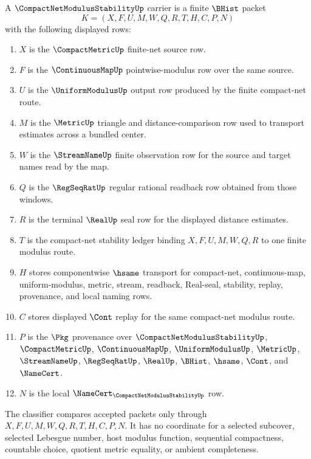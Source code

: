 \begin{definition}
\label{def:compact-net-modulus-stability-carrier}
A $\CompactNetModulusStabilityUp$ carrier is a finite $\BHist$ packet
$$
K=(X,F,U,M,W,Q,R,T,H,C,P,N)
$$
with the following displayed rows:
\begin{enumerate}
\item $X$ is the $\CompactMetricUp$ finite-net source row.
\item $F$ is the $\ContinuousMapUp$ pointwise-modulus row over the same source.
\item $U$ is the $\UniformModulusUp$ output row produced by the finite compact-net route.
\item $M$ is the $\MetricUp$ triangle and distance-comparison row used to transport estimates across a bundled center.
\item $W$ is the $\StreamNameUp$ finite observation row for the source and target names read by the map.
\item $Q$ is the $\RegSeqRatUp$ regular rational readback row obtained from those windows.
\item $R$ is the terminal $\RealUp$ seal row for the displayed distance estimates.
\item $T$ is the compact-net stability ledger binding $X,F,U,M,W,Q,R$ to one finite modulus route.
\item $H$ stores componentwise $\hsame$ transport for compact-net, continuous-map, uniform-modulus, metric, stream, readback, Real-seal, stability, replay, provenance, and local naming rows.
\item $C$ stores displayed $\Cont$ replay for the same compact-net modulus route.
\item $P$ is the $\Pkg$ provenance over $\CompactNetModulusStabilityUp$, $\CompactMetricUp$, $\ContinuousMapUp$, $\UniformModulusUp$, $\MetricUp$, $\StreamNameUp$, $\RegSeqRatUp$, $\RealUp$, $\BHist$, $\hsame$, $\Cont$, and $\NameCert$.
\item $N$ is the local $\NameCert_{\CompactNetModulusStabilityUp}$ row.
\end{enumerate}
The classifier compares accepted packets only through $X,F,U,M,W,Q,R,T,H,C,P,N$. It has no coordinate for a selected subcover, selected Lebesgue number, host modulus function, sequential compactness, countable choice, quotient metric equality, or ambient completeness.
\end{definition}

